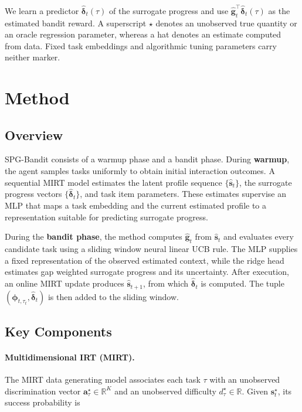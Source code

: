 \documentclass{article} %
\begin{document}
We learn a predictor \(\widehat{\boldsymbol{\delta}}_t(\tau)\) of the surrogate progress and use \(\widehat{\mathbf{g}}_t^\top\widehat{\boldsymbol{\delta}}_t(\tau)\) as the estimated bandit reward. A superscript \(\star\) denotes an unobserved true quantity or an oracle regression parameter, whereas a hat denotes an estimate computed from data. Fixed task embeddings and algorithmic tuning parameters carry neither marker.


\section{Method}
\label{sec:method}

\subsection{Overview}

SPG-Bandit consists of a warmup phase and a bandit phase. During \textbf{warmup}, the agent samples tasks uniformly to obtain initial interaction outcomes. A sequential MIRT model estimates the latent profile sequence \(\{\widehat{\mathbf{s}}_t\}\), the surrogate progress vectors \(\{\widehat{\boldsymbol{\delta}}_t\}\), and task item parameters. These estimates supervise an MLP that maps a task embedding and the current estimated profile to a representation suitable for predicting surrogate progress.
    
During the \textbf{bandit phase}, the method computes \(\widehat{\mathbf{g}}_t\) from \(\widehat{\mathbf{s}}_t\) and evaluates every candidate task using a sliding window neural linear UCB rule. The MLP supplies a fixed representation of the observed estimated context, while the ridge head estimates gap weighted surrogate progress and its uncertainty. After execution, an online MIRT update produces \(\widehat{\mathbf{s}}_{t+1}\), from which \(\widehat{\boldsymbol{\delta}}_t\) is computed. The tuple \((\boldsymbol{\phi}_{t,\tau_t},\widehat{\boldsymbol{\delta}}_t)\) is then added to the sliding window.

\subsection{Key Components}

\paragraph{Multidimensional IRT (MIRT).}
The MIRT data generating model associates each task \(\tau\) with an unobserved discrimination vector \(\mathbf{a}_\tau^\star\in\mathbb{R}^K\) and an unobserved difficulty \(d_\tau^\star\in\mathbb{R}\). Given \(\mathbf{s}_t^\star\), its success probability is
\end{document}
